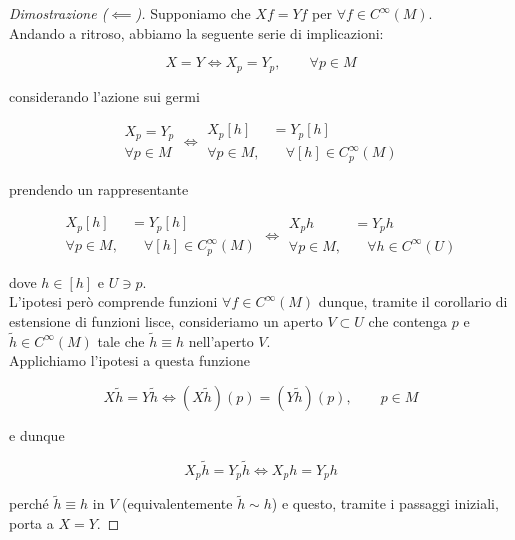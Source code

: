 \begin{proof}[Dimostrazione ($ \impliedby $)]
	Supponiamo che $ X f = Y f $ per $ \forall f \in C^{\infty}(M) $.\\
	Andando a ritroso, abbiamo la seguente serie di implicazioni:
	
	\begin{equation}
		X = Y \iff X_{p} = Y_{p}, \qquad \forall p \in M
	\end{equation}

	considerando l'azione sui germi
	
	\begin{equation}
		\begin{aligned}
			X_{p} = Y_{p}\\
			\forall p \in M
		\end{aligned}%
		 \iff %
		 \begin{aligned}
			 X_{p} [h] &= Y_{p} [h]\\
			 \forall p \in M,& \quad \forall [h] \in C_{p}^{\infty}(M)
		 \end{aligned}
	\end{equation}

	prendendo un rappresentante
	
	\begin{equation}
		\begin{aligned}
			X_{p} [h] &= Y_{p} [h]\\
			\forall p \in M,& \quad \forall [h] \in C_{p}^{\infty}(M)
		\end{aligned}%
		\iff %
		\begin{aligned}
			X_{p} h &= Y_{p} h\\
			\forall p \in M,& \quad \forall h \in C^{\infty}(U)
		\end{aligned}
	\end{equation}
	
	dove $ h \in [h] $ e $ U \ni p $.\\
	L'ipotesi però comprende funzioni $ \forall f \in C^{\infty}(M) $ dunque, tramite il corollario di estensione di funzioni lisce, consideriamo un aperto $ V \subset U $ che contenga $ p $ e $ \tilde{h} \in C^{\infty}(M) $ tale che $ \tilde{h} \equiv h $ nell'aperto $ V $.\\
	Applichiamo l'ipotesi a questa funzione
	
	\begin{equation}
		X \tilde{h} = Y \tilde{h} \iff (X \tilde{h})(p) = (Y \tilde{h})(p), \qquad p \in M
	\end{equation}

	e dunque
	
	\begin{equation}
		X_{p} \tilde{h} = Y_{p} \tilde{h} \iff X_{p} h = Y_{p} h
	\end{equation}

	perché $ \tilde{h} \equiv h $ in $ V $ (equivalentemente $ \tilde{h} \sim h $) e questo, tramite i passaggi iniziali, porta a $ X = Y $.
\end{proof}

